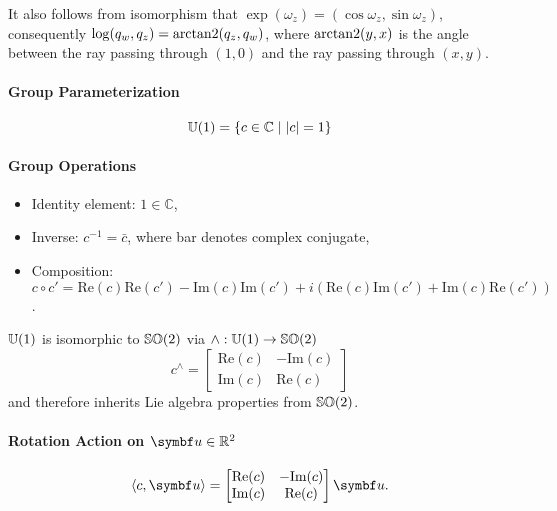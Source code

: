 It also follows from isomorphism that $\exp(\omega_{z}) = (\cos \omega_{z}, \sin \omega_{z})$, consequently $\log (q_{w}, q_{z}) = \operatorname{arctan2}(q_{z}, q_{w})$, where $\operatorname{arctan2}(y, x)$ is the angle between the ray passing through $(1, 0)$ and the ray passing through $(x, y)$.

\begin{properties}[breakable, title={$\Uone$ as a parameterization of $\SOtwo$}]
  \paragraph{Group Parameterization}
  \begin{equation}
    {\mathbb{U}(1)} = \left\{ c \in \mathbb{C} \mid |c| = 1 \right\}
  \end{equation}
  \paragraph{Group Operations}
  \begin{itemize}
    \item Identity element: $1 \in \mathbb{C}$,
    \item Inverse: $c^{-1} = \bar c$, where bar denotes complex conjugate,
    \item Composition: $c \circ c' = \textrm{Re}(c) \textrm{Re}(c') - \textrm{Im}(c)\textrm{Im}(c') + i \left(\textrm{Re}(c) \textrm{Im}(c') + \textrm{Im}(c) \textrm{Re}(c') \right)$.
  \end{itemize}

  $\Uone$ is isomorphic to $\SOtwo$ via $\wedge: {\mathbb{U}(1)} \rightarrow {\mathbb{SO}(2)}$
  \begin{equation}
    c^{\wedge} = \begin{bmatrix} \textrm{Re}(c) & -\textrm{Im}(c) \\ \textrm{Im}(c) & \textrm{Re}(c) \end{bmatrix}
  \end{equation}
  and therefore inherits Lie algebra properties from $\SOtwo$.

  \paragraph{Rotation Action on $\bu \in \mathbb{R}^{2}$}
  \begin{equation}
    \left\langle c, \bu \right \rangle = \begin{bmatrix} \textrm{Re}(c) & -\textrm{Im}(c) \\ \textrm{Im}(c) & \textrm{Re}(c) \end{bmatrix} \bu.
  \end{equation}


\end{properties}
